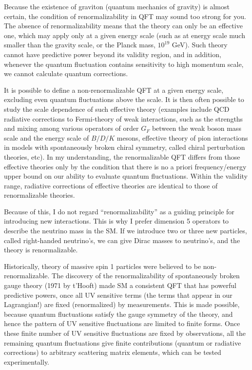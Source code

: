 \documentclass[12pt]{article}
\begin{document}
Because the existence of graviton (quantum mechanics of gravity) is
almost certain, the condition of renormalizability in QFT may sound
too strong for you. The absence of renormalizability means that the
theory can only be an effective one, which may apply only at a given
energy scale (such as at energy scale much smaller than the gravity
scale, or the Planck mass, $10^{19}$ GeV). Such theory cannot have
predictive power beyond its validity region, and in addition,
whenever the quantum fluctuation contains sensitivity to high
momentum scale, we cannot calculate quantum corrections.

It is possible to define a non-renormalizable QFT at a given energy
scale, excluding even quantum fluctuations above the scale.  It is
then often possible to study the scale dependence of such effective
theory (examples include QCD radiative corrections to Fermi-theory
of weak interactions, such as the strengths and mixing among various
operators of order $G_F$ between the weak boson mass scale and the energy
scale of $B/D/K$ mesons, effective theory of pion interactions in models
with spontaneously broken chiral symmetry, called chiral perturbation
theories, etc). In my understanding, the renormalizable QFT differs
from those effective theories only by the condition that there is no
a priori frequency/energy upper bound on our ability to evaluate
quantum fluctuations. Within the validity range, radiative corrections
of effective theories are identical to those of renormalizable theories.

Because of this, I do not regard ``renormalizability'' as a guiding
principle for introducing new interactions.  This is why I prefer
dimension 5 operators to describe the neutrino mass in the SM.
If we introduce two or three new particles, called right-handed
neutrino's, we can give Dirac masses to neutrino's, and the theory
is renormalizable.

Historically, theory of massive spin 1 particles were believed to be
non-renormalizable.  The discovery of the renormalizability of
spontaneously broken gauge theory (1971 by t'Hooft) made SM a consistent
QFT that has powerful predictive powers, once all UV sensitive terms
(the terms that appear in our Lagrangian!) are fixed (renormalized)
by measurements.  This is made possible, because quantum fluctuations
satisfy the gauge symmetry of the theory, and hence the pattern of
UV sensitive fluctuations are limited to finite forms.  Once these
finite number of UV sensitive fluctuations are fixed by observations,
all the remaining quantum fluctuations give finite contributions
(quantum or radiative corrections) to arbitrary scattering matrix
elements, which can be tested experimentally.
\end{document}
